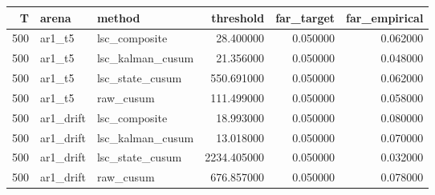 \begin{tabular}{rllrrr}
\toprule
T & arena & method & threshold & far_target & far_empirical \\
\midrule
500 & ar1_t5 & lsc_composite & 28.400000 & 0.050000 & 0.062000 \\
500 & ar1_t5 & lsc_kalman_cusum & 21.356000 & 0.050000 & 0.048000 \\
500 & ar1_t5 & lsc_state_cusum & 550.691000 & 0.050000 & 0.062000 \\
500 & ar1_t5 & raw_cusum & 111.499000 & 0.050000 & 0.058000 \\
500 & ar1_drift & lsc_composite & 18.993000 & 0.050000 & 0.080000 \\
500 & ar1_drift & lsc_kalman_cusum & 13.018000 & 0.050000 & 0.070000 \\
500 & ar1_drift & lsc_state_cusum & 2234.405000 & 0.050000 & 0.032000 \\
500 & ar1_drift & raw_cusum & 676.857000 & 0.050000 & 0.078000 \\
\bottomrule
\end{tabular}
